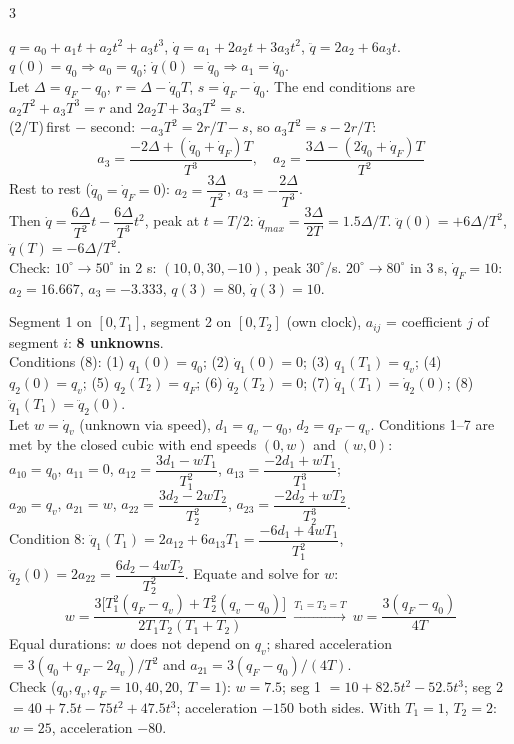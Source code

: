 \begin{multicols}{3}
\begin{fbx}
$q=a_0+a_1t+a_2t^2+a_3t^3$, $\dot q=a_1+2a_2t+3a_3t^2$, $\ddot q=2a_2+6a_3t$.\\
$q(0)=q_0\Rightarrow a_0=q_0$; $\dot q(0)=\dot q_0\Rightarrow a_1=\dot q_0$.\\
Let $\Delta=q_F-q_0$, $r=\Delta-\dot q_0T$, $s=\dot q_F-\dot q_0$. The end conditions are\\
$a_2T^2+a_3T^3=r$ and $2a_2T+3a_3T^2=s$.\\
(2/T)\,first $-$ second: $-a_3T^2=2r/T-s$, so $a_3T^2=s-2r/T$:
\[a_3=\frac{-2\Delta+(\dot q_0+\dot q_F)T}{T^3},\quad a_2=\frac{3\Delta-(2\dot q_0+\dot q_F)T}{T^2}\]
Rest to rest ($\dot q_0=\dot q_F=0$): $a_2=\dfrac{3\Delta}{T^2}$, $a_3=-\dfrac{2\Delta}{T^3}$.\\
Then $\dot q=\dfrac{6\Delta}{T^2}t-\dfrac{6\Delta}{T^3}t^2$, peak at $t=T/2$: $\dot q_{max}=\dfrac{3\Delta}{2T}=1.5\Delta/T$. $\ddot q(0)=+6\Delta/T^2$, $\ddot q(T)=-6\Delta/T^2$.\\
Check: $10^\circ\to50^\circ$ in 2 s: $(10,0,30,-10)$, peak $30^\circ$/s. $20^\circ\to80^\circ$ in 3 s, $\dot q_F=10$: $a_2=16.667$, $a_3=-3.333$, $q(3)=80$, $\dot q(3)=10$. \chk
\end{fbx}

\begin{fbx}
Segment 1 on $[0,T_1]$, segment 2 on $[0,T_2]$ (own clock), $a_{ij}$ = coefficient $j$ of segment $i$: \textbf{8 unknowns}.\\
Conditions (8): (1) $q_1(0)=q_0$; (2) $\dot q_1(0)=0$; (3) $q_1(T_1)=q_v$; (4) $q_2(0)=q_v$; (5) $q_2(T_2)=q_F$; (6) $\dot q_2(T_2)=0$; (7) $\dot q_1(T_1)=\dot q_2(0)$; (8) $\ddot q_1(T_1)=\ddot q_2(0)$.\\
Let $w=\dot q_v$ (unknown via speed), $d_1=q_v-q_0$, $d_2=q_F-q_v$. Conditions 1--7 are met by the closed cubic with end speeds $(0,w)$ and $(w,0)$:\\
$a_{10}=q_0$, $a_{11}=0$, $a_{12}=\dfrac{3d_1-wT_1}{T_1^2}$, $a_{13}=\dfrac{-2d_1+wT_1}{T_1^3}$;\\
$a_{20}=q_v$, $a_{21}=w$, $a_{22}=\dfrac{3d_2-2wT_2}{T_2^2}$, $a_{23}=\dfrac{-2d_2+wT_2}{T_2^3}$.\\
Condition 8: $\ddot q_1(T_1)=2a_{12}+6a_{13}T_1=\dfrac{-6d_1+4wT_1}{T_1^2}$, $\ddot q_2(0)=2a_{22}=\dfrac{6d_2-4wT_2}{T_2^2}$. Equate and solve for $w$:
\[w=\frac{3\big[T_1^2(q_F-q_v)+T_2^2(q_v-q_0)\big]}{2T_1T_2(T_1+T_2)}\ \xrightarrow{T_1=T_2=T}\ w=\frac{3(q_F-q_0)}{4T}\]
Equal durations: $w$ does not depend on $q_v$; shared acceleration $=3(q_0+q_F-2q_v)/T^2$ and $a_{21}=3(q_F-q_0)/(4T)$.\\
Check ($q_0,q_v,q_F=10,40,20$, $T=1$): $w=7.5$; seg 1 $=10+82.5t^2-52.5t^3$; seg 2 $=40+7.5t-75t^2+47.5t^3$; acceleration $-150$ both sides. With $T_1=1$, $T_2=2$: $w=25$, acceleration $-80$. \chk
\end{fbx}


\end{multicols}
